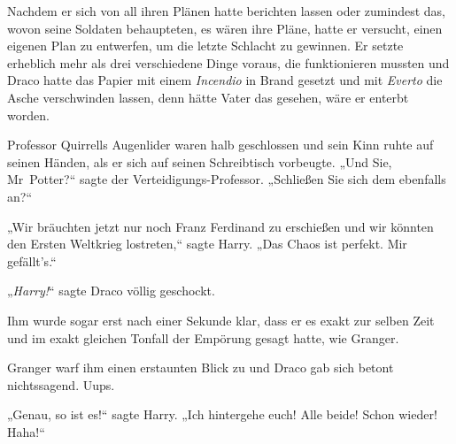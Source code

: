 Nachdem er sich von all ihren Plänen hatte berichten lassen oder zumindest das, wovon seine Soldaten behaupteten, es wären ihre Pläne, hatte er versucht, einen eigenen Plan zu entwerfen, um die letzte Schlacht zu gewinnen. Er setzte erheblich mehr als drei verschiedene Dinge voraus, die funktionieren mussten und Draco hatte das Papier mit einem \emph{Incendio} in Brand gesetzt und mit \emph{Everto} die Asche verschwinden lassen, denn hätte Vater das gesehen, wäre er enterbt worden.

Professor Quirrells Augenlider waren halb geschlossen und sein Kinn ruhte auf seinen Händen, als er sich auf seinen Schreibtisch vorbeugte. „Und Sie, Mr~Potter?“ sagte der Verteidigungs-Professor. „Schließen Sie sich dem ebenfalls an?“

„Wir bräuchten jetzt nur noch Franz Ferdinand zu erschießen und wir könnten den Ersten Weltkrieg lostreten,“ sagte Harry. „Das Chaos ist perfekt. Mir gefällt’s.“

„\emph{Harry!}“ sagte Draco völlig geschockt.

Ihm wurde sogar erst nach einer Sekunde klar, dass er es exakt zur selben Zeit und im exakt gleichen Tonfall der Empörung gesagt hatte, wie Granger.

Granger warf ihm einen erstaunten Blick zu und Draco gab sich betont nichtssagend. Uups.

„Genau, so ist es!“ sagte Harry. „Ich hintergehe euch! Alle beide! Schon wieder! Haha!“

